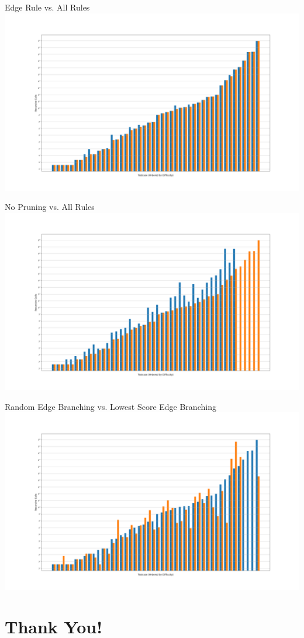 \documentclass[12pt]{article}
\begin{document}
\newpage
\begin{center} Edge Rule vs. All Rules\\\includegraphics[scale=.5]{edgefull.png} \end{center}

\newpage
\begin{center} No Pruning vs. All Rules\\\includegraphics[scale=.5]{nonefull.png} \end{center}

\newpage
\begin{center} Random Edge Branching vs. Lowest Score Edge Branching\\\includegraphics[scale=.5]{branching.png} \end{center}

\newpage
\section*{Thank You!}
\end{document}
